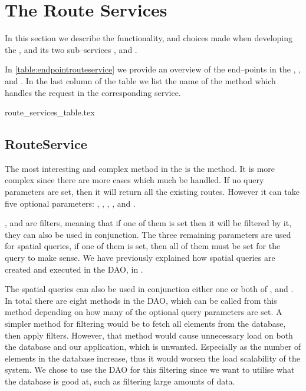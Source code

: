 \section{The Route Services}
In this section we describe the functionality, and choices made when developing the , 
and its two sub--services , and .

In \cref{table:endpointrouteservice} we provide an overview of the end--points in the , , and . 
In the last column of the table we list the name of the method which handles the request in the corresponding service. 

{route_services_table.tex}

\subsection{RouteService}
The most interesting and complex method in the  is the  method.
It is more complex since there are more cases which much be handled. 
If no query parameters are set, then it will return all the existing routes.
However it can take five optional parameters: , , , , and .

, and  are filters, meaning that if one of them is set then it will be filtered by it, 
they can also be used in conjunction.
The three remaining parameters are used for spatial queries, if one of them is set, then all of them must be set for the query to make sense.
We have previously explained how spatial queries are created and executed in the \ac{DAO}, in .

The spatial queries can also be used in conjunction either one or both of , and . 
In total there are eight methods in the \ac{DAO}, which can be called from this method depending on how many of the optional query parameters are set.
A simpler method for filtering would be to fetch all elements from the database, then apply filters. 
However, that method would cause unnecessary load on both the database and our application, which is unwanted. 
Especially as the number of elements in the database increase, thus it would worsen the load scalability of the system. 
We chose to use the \ac{DAO} for this filtering since we want to utilise what the database is good at, such as filtering large amounts of data.

